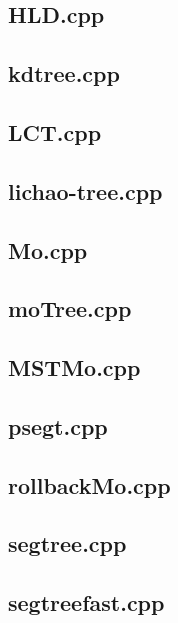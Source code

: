 \subsection{HLD.cpp}


\subsection{kdtree.cpp}


\subsection{LCT.cpp}


\subsection{lichao-tree.cpp}


\subsection{Mo.cpp}


\subsection{moTree.cpp}


\subsection{MSTMo.cpp}


\subsection{psegt.cpp}


\subsection{rollbackMo.cpp}


\subsection{segtree.cpp}


\subsection{segtreefast.cpp}


